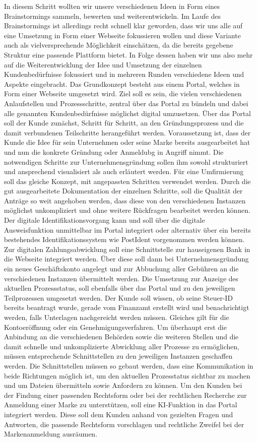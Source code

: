 In diesem Schritt wollten wir unsere verschiedenen Ideen in Form eines Brainstormings sammeln, bewerten und weiterentwickeln.
Im Laufe des Brainstormings ist allerdings recht schnell klar geworden, dass wir uns alle auf eine Umsetzung in Form einer Webseite fokussieren wollen und diese Variante auch als vielversprechende Möglichkeit einschätzen, da die bereits gegebene Struktur eine passende Plattform bietet.
In Folge dessen haben wir uns also mehr auf die Weiterentwicklung der Idee und Umsetzung der einzelnen Kundenbedürfnisse fokussiert und in mehreren Runden verschiedene Ideen und Aspekte eingebracht.
Das Grundkonzept besteht aus einem Portal, welches in Form einer Webseite umgesetzt wird. Ziel soll es sein, die vielen verschiedenen Anlaufstellen und Prozessschritte, zentral über das Portal zu bündeln und dabei alle genannten Kundenbedürfnisse möglichst digital umzusetzen.
Über das Portal soll der Kunde zunächst, Schritt für Schritt, an den Gründungsprozess und die damit verbundenen Teilschritte herangeführt werden. Voraussetzung ist, dass der Kunde die Idee für sein Unternehmen oder seine Marke bereits ausgearbeitet hat und nun die konkrete Gründung oder Anmeldubg in Angriff nimmt. Die notwendigen Schritte zur Unternehmensgründung sollen ihm sowohl strukturiert und ansprechend visualisiert als auch erläutert werden. Für eine Umfirmierung soll das gleiche Konzept, mit angepassten Schritten verwendet werden.
Durch die gut ausgearbeitete Dokumentation der einzelnen Schritte, soll die Qualität der Anträge so weit angehoben werden, dass diese von den verschiedenen Instanzen möglichst unkompliziert und ohne weitere Rückfragen bearbeitet werden können.
Der digitale Identifikationsvorgang kann und soll über die digitale Ausweisfunktion unmittelbar im Portal integriert oder alternativ über ein bereits bestehendes Identifikationssystem wie PostIdent vorgenommen werden können. Zur digitalen Zahlungsabwicklung soll eine Schnittstelle zur hauseigenen Bank in die Webseite integriert werden. Über diese soll dann bei Unternehmensgründung ein neues Geschäftskonto angelegt und zur Abbuchung aller Gebühren an die verschiedenen Instanzen übermittelt werden.
Die Umsetzung zur Anzeige des aktuellen Prozessstatus, soll ebenfalls über das Portal und zu den jeweiligen Teilprozessen umgesetzt werden. Der Kunde soll wissen, ob seine Steuer-ID bereits beantragt wurde, gerade vom Finanzamt erstellt wird und benachrichtigt werden, falls Unterlagen nachgereicht werden müssen. Gleiches gilt für die Kontoeröffnung oder ein Genehmigungsverfahren.
Um überhaupt erst die Anbindung an die verschiedenen Behörden sowie die weiteren Stellen und die damit schnelle und unkomplizierte Abwicklung aller Prozesse zu ermöglichen, müssen entsprechende Schnittstellen zu den jeweiligen Instanzen geschaffen werden. Die Schnittstellen müssen so gebaut werden, dass eine Kommunikation in beide Richtungen möglich ist, um den aktuellen Prozesstatus sichtbar zu machen und um Dateien übermitteln sowie Anfordern zu können.
Um den Kunden bei der Findung einer passenden Rechtsform oder bei der rechtlichen Recherche zur Anmeldung einer Marke zu unterstützen, soll eine KI-Funktion in das Portal integriert werden. Diese soll dem Kunden anhand von gezielten Fragen und Antworten, die passende Rechtsform vorschlagen und rechtliche Zweifel bei der Markenanmeldung ausräumen.